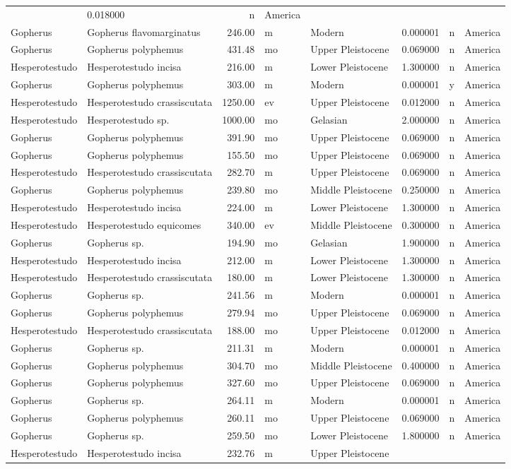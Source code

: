 \documentclass[]{article}
\begin{document}
\begin{longtable}[]{@{}llrllrll@{}}
& 0.018000 & n & America\tabularnewline
Gopherus & Gopherus flavomarginatus & 246.00 & m & Modern & 0.000001 & n
& America\tabularnewline
Gopherus & Gopherus polyphemus & 431.48 & mo & Upper Pleistocene &
0.069000 & n & America\tabularnewline
Hesperotestudo & Hesperotestudo incisa & 216.00 & m & Lower Pleistocene
& 1.300000 & n & America\tabularnewline
Gopherus & Gopherus polyphemus & 303.00 & m & Modern & 0.000001 & y &
America\tabularnewline
Hesperotestudo & Hesperotestudo crassiscutata & 1250.00 & ev & Upper
Pleistocene & 0.012000 & n & America\tabularnewline
Hesperotestudo & Hesperotestudo sp. & 1000.00 & mo & Gelasian & 2.000000
& n & America\tabularnewline
Gopherus & Gopherus polyphemus & 391.90 & mo & Upper Pleistocene &
0.069000 & n & America\tabularnewline
Gopherus & Gopherus polyphemus & 155.50 & mo & Upper Pleistocene &
0.069000 & n & America\tabularnewline
Hesperotestudo & Hesperotestudo crassiscutata & 282.70 & m & Upper
Pleistocene & 0.069000 & n & America\tabularnewline
Gopherus & Gopherus polyphemus & 239.80 & mo & Middle Pleistocene &
0.250000 & n & America\tabularnewline
Hesperotestudo & Hesperotestudo incisa & 224.00 & m & Lower Pleistocene
& 1.300000 & n & America\tabularnewline
Hesperotestudo & Hesperotestudo equicomes & 340.00 & ev & Middle
Pleistocene & 0.300000 & n & America\tabularnewline
Gopherus & Gopherus sp. & 194.90 & mo & Gelasian & 1.900000 & n &
America\tabularnewline
Hesperotestudo & Hesperotestudo incisa & 212.00 & m & Lower Pleistocene
& 1.300000 & n & America\tabularnewline
Hesperotestudo & Hesperotestudo crassiscutata & 180.00 & m & Lower
Pleistocene & 1.300000 & n & America\tabularnewline
Gopherus & Gopherus sp. & 241.56 & m & Modern & 0.000001 & n &
America\tabularnewline
Gopherus & Gopherus polyphemus & 279.94 & mo & Upper Pleistocene &
0.069000 & n & America\tabularnewline
Hesperotestudo & Hesperotestudo crassiscutata & 188.00 & mo & Upper
Pleistocene & 0.012000 & n & America\tabularnewline
Gopherus & Gopherus sp. & 211.31 & m & Modern & 0.000001 & n &
America\tabularnewline
Gopherus & Gopherus polyphemus & 304.70 & mo & Middle Pleistocene &
0.400000 & n & America\tabularnewline
Gopherus & Gopherus polyphemus & 327.60 & mo & Upper Pleistocene &
0.069000 & n & America\tabularnewline
Gopherus & Gopherus sp. & 264.11 & m & Modern & 0.000001 & n &
America\tabularnewline
Gopherus & Gopherus polyphemus & 260.11 & mo & Upper Pleistocene &
0.069000 & n & America\tabularnewline
Gopherus & Gopherus sp. & 259.50 & mo & Lower Pleistocene & 1.800000 & n
& America\tabularnewline
Hesperotestudo & Hesperotestudo incisa & 232.76 & m & Upper Pleistocene

\end{longtable}
\end{document}
